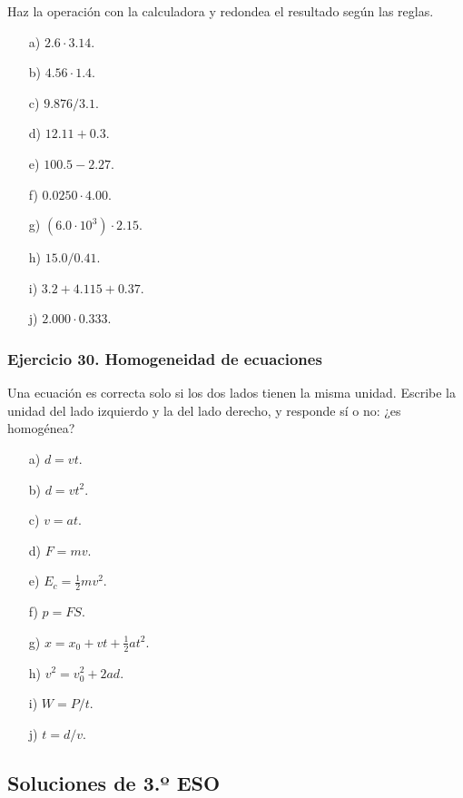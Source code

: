 Haz la operación con la calculadora y redondea el resultado según las reglas.

\begin{enumerate}
    \item[a)] $2.6\cdot3.14$.
    \item[b)] $4.56\cdot1.4$.
    \item[c)] $9.876/3.1$.
    \item[d)] $12.11+0.3$.
    \item[e)] $100.5-2.27$.
    \item[f)] $0.0250\cdot4.00$.
    \item[g)] $(6.0\cdot10^3)\cdot2.15$.
    \item[h)] $15.0/0.41$.
    \item[i)] $3.2+4.115+0.37$.
    \item[j)] $2.000\cdot0.333$.
\end{enumerate}

\subsubsection*{Ejercicio 30. Homogeneidad de ecuaciones}

Una ecuación es correcta solo si los dos lados tienen la misma unidad.
Escribe la unidad del lado izquierdo y la del lado derecho,
y responde sí o no: ¿es homogénea?

\begin{enumerate}
    \item[a)] $d=vt$.
    \item[b)] $d=vt^2$.
    \item[c)] $v=at$.
    \item[d)] $F=mv$.
    \item[e)] $E_c=\frac{1}{2}mv^2$.
    \item[f)] $p=FS$.
    \item[g)] $x=x_0+vt+\frac{1}{2}at^2$.
    \item[h)] $v^2=v_0^2+2ad$.
    \item[i)] $W=P/t$.
    \item[j)] $t=d/v$.
\end{enumerate}

\subsection{Soluciones de 3.º ESO}

